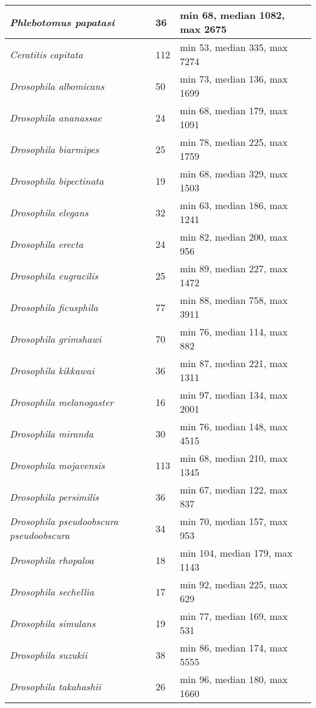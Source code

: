 {\begin{longtable}{| L{4cm} | L{2cm}  | L{5cm} | L{4cm} |}
\textit{Phlebotomus papatasi} & 36 & min 68, median 1082, max 2675 & \\ \hline
\textit{Ceratitis capitata} & 112 & min 53, median 335, max 7274 & \\ \hline
\textit{Drosophila albomicans} & 50 & min 73, median 136, max 1699 & \\ \hline
\textit{Drosophila ananassae} & 24 & min 68, median 179, max 1091 & \\ \hline
\textit{Drosophila biarmipes} & 25 & min 78, median 225, max 1759 & \\ \hline
\textit{Drosophila bipectinata} & 19 & min 68, median 329, max 1503 & \\ \hline
\textit{Drosophila elegans} & 32 & min 63, median 186, max 1241 & \\ \hline
\textit{Drosophila erecta} & 24 & min 82, median 200, max 956 & \\ \hline
\textit{Drosophila eugracilis} & 25 & min 89, median 227, max 1472 & \\ \hline
\textit{Drosophila ficusphila} & 77 & min 88, median 758, max 3911 & \\ \hline
\textit{Drosophila grimshawi} & 70 & min 76, median 114, max 882 & \\ \hline
\textit{Drosophila kikkawai} & 36 & min 87, median 221, max 1311 & \\ \hline
\textit{Drosophila melanogaster} & 16 & min 97, median 134, max 2001 & \\ \hline
\textit{Drosophila miranda} & 30 & min 76, median 148, max 4515 & \\ \hline
\textit{Drosophila mojavensis} & 113 & min 68, median 210, max 1345 & \\ \hline
\textit{Drosophila persimilis} & 36 & min 67, median 122, max 837 & \\ \hline
\textit{Drosophila pseudoobscura pseudoobscura} & 34 & min 70, median 157, max 953 & \\ \hline
\textit{Drosophila rhopaloa} & 18 & min 104, median 179, max 1143 & \\ \hline
\textit{Drosophila sechellia} & 17 & min 92, median 225, max 629 & \\ \hline
\textit{Drosophila simulans} & 19 & min 77, median 169, max 531 & \\ \hline
\textit{Drosophila suzukii} & 38 & min 86, median 174, max 5555 & \\ \hline
\textit{Drosophila takahashii} & 26 & min 96, median 180, max 1660 & \\ \hline

\end{longtable}}
